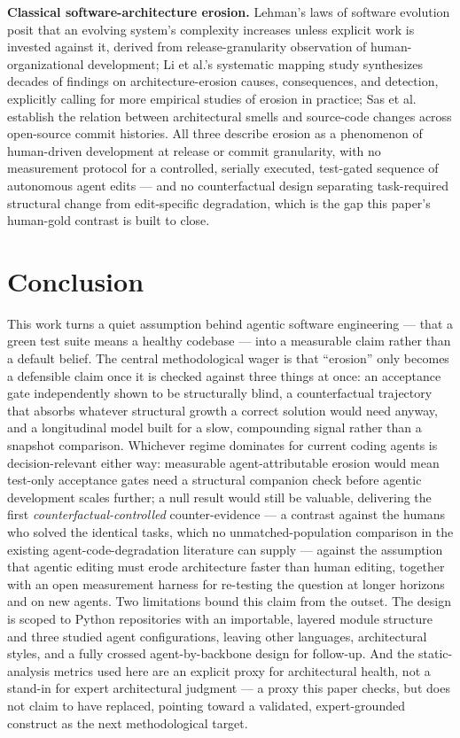 \documentclass[11pt]{article}
\begin{document}
\textbf{Classical software-architecture erosion.} Lehman's laws of software evolution posit that an evolving system's complexity increases unless explicit work is invested against it, derived from release-granularity observation of human-organizational development; Li et al.'s systematic mapping study synthesizes decades of findings on architecture-erosion causes, consequences, and detection, explicitly calling for more empirical studies of erosion in practice; Sas et al. establish the relation between architectural smells and source-code changes across open-source commit histories. All three describe erosion as a phenomenon of human-driven development at release or commit granularity, with no measurement protocol for a controlled, serially executed, test-gated sequence of autonomous agent edits --- and no counterfactual design separating task-required structural change from edit-specific degradation, which is the gap this paper's human-gold contrast is built to close.

\section{Conclusion}

This work turns a quiet assumption behind agentic software engineering --- that a green test suite means a healthy codebase --- into a measurable claim rather than a default belief. The central methodological wager is that ``erosion'' only becomes a defensible claim once it is checked against three things at once: an acceptance gate independently shown to be structurally blind, a counterfactual trajectory that absorbs whatever structural growth a correct solution would need anyway, and a longitudinal model built for a slow, compounding signal rather than a snapshot comparison. Whichever regime dominates for current coding agents is decision-relevant either way: measurable agent-attributable erosion would mean test-only acceptance gates need a structural companion check before agentic development scales further; a null result would still be valuable, delivering the first \emph{counterfactual-controlled} counter-evidence --- a contrast against the humans who solved the identical tasks, which no unmatched-population comparison in the existing agent-code-degradation literature can supply --- against the assumption that agentic editing must erode architecture faster than human editing, together with an open measurement harness for re-testing the question at longer horizons and on new agents. Two limitations bound this claim from the outset. The design is scoped to Python repositories with an importable, layered module structure and three studied agent configurations, leaving other languages, architectural styles, and a fully crossed agent-by-backbone design for follow-up. And the static-analysis metrics used here are an explicit proxy for architectural health, not a stand-in for expert architectural judgment --- a proxy this paper checks, but does not claim to have replaced, pointing toward a validated, expert-grounded construct as the next methodological target.
\end{document}
